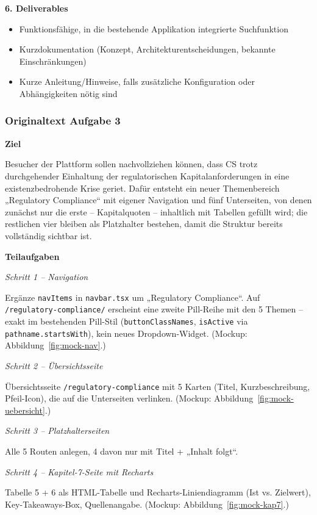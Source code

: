 \documentclass[11pt,a4paper]{article}
\newcommand{\minihead}[1]{\par\needspace{5\baselineskip}\noindent\textbf{#1}\par\nobreak}
\newcommand{\miniheadit}[1]{\par\needspace{5\baselineskip}\noindent\textit{#1}\par\nobreak}
\let\oldsubsubsection\subsubsection
\renewcommand{\subsubsection}{\needspace{6\baselineskip}\oldsubsubsection}
\begin{document}
\minihead{6. Deliverables}
\begin{itemize}[nosep]
  \item Funktionsfähige, in die bestehende Applikation integrierte Suchfunktion
  \item Kurzdokumentation (Konzept, Architekturentscheidungen, bekannte Einschränkungen)
  \item Kurze Anleitung/Hinweise, falls zusätzliche Konfiguration oder Abhängigkeiten nötig sind
\end{itemize}

\subsubsection{Originaltext Aufgabe 3}
\minihead{Ziel}

Besucher der Plattform sollen nachvollziehen können, dass CS trotz durchgehender Einhaltung der regulatorischen Kapitalanforderungen in eine existenzbedrohende Krise geriet. Dafür entsteht ein neuer Themenbereich „Regulatory Compliance“ mit eigener Navigation und fünf Unterseiten, von denen zunächst nur die erste – Kapitalquoten – inhaltlich mit Tabellen gefüllt wird; die restlichen vier bleiben als Platzhalter bestehen, damit die Struktur bereits vollständig sichtbar ist.

\minihead{Teilaufgaben}

\miniheadit{Schritt 1 – Navigation}

Ergänze \texttt{navItems} in \texttt{navbar.tsx} um „Regulatory Compliance“. Auf \texttt{/regulatory-compliance/\allowbreak *} erscheint eine zweite Pill-Reihe mit den 5 Themen – exakt im bestehenden Pill-Stil (\texttt{buttonClassNames}, \texttt{isActive} via \texttt{pathname.startsWith}), kein neues Dropdown-Widget. (Mockup: Abbildung~\ref{fig:mock-nav}.)

\miniheadit{Schritt 2 – Übersichtsseite}

Übersichtsseite \texttt{/regulatory-compliance} mit 5 Karten (Titel, Kurzbeschreibung, Pfeil-Icon), die auf die Unterseiten verlinken. (Mockup: Abbildung~\ref{fig:mock-uebersicht}.)

\miniheadit{Schritt 3 – Platzhalterseiten}

Alle 5 Routen anlegen, 4 davon nur mit Titel + „Inhalt folgt“.

\miniheadit{Schritt 4 – Kapitel-7-Seite mit Recharts}

Tabelle 5 + 6 als HTML-Tabelle und Recharts-Liniendiagramm (Ist vs. Zielwert), Key-Takeaways-Box, Quellenangabe. (Mockup: Abbildung~\ref{fig:mock-kap7}.)
\end{document}
